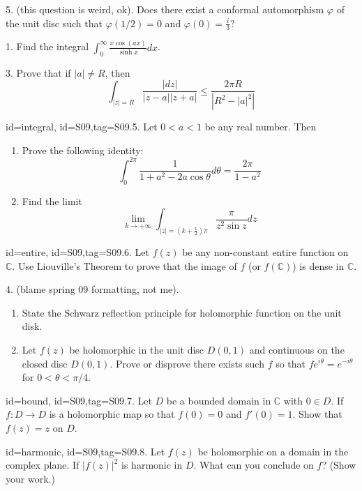 \documentclass[12pt,letterpaper]{article}
\theoremstyle{plain}
\theoremstyle{definition}
\begin{document}
{5. (this question is weird, ok). Does there exist a conformal automorphism $\varphi$ of the unit disc such that $\varphi(1/2) = 0$ and $\varphi(0) = \frac{i}{3}$?

1. Find the integral $\int_{0}^{\infty} \frac{x \cos(ax)}{\sinh x} dx$.

3. Prove that if $| a | \ne R$, then
\[
	\int_{| z | = R} \frac{| dz |}{| z-a || z+a |} \le \frac{2 \pi R}{\left| R^2 - | a |^2 \right|}
\]



\item[id=integral, id=S09,tag=S09.5.]
Let $0 < a < 1$ be any real number. Then
\begin{enumerate}[label=(\alph*)]\onlyitems
\item Prove the following identity:
\[
	\int_{0}^{2\pi} \frac{1}{1 + a^2 - 2a \cos \theta} d\theta = \frac{2\pi}{1-a^2}
\]
\item Find the limit
\[
	\lim_{k\rightarrow+\infty} \int_{| z | = (k + \frac{1}{2})\pi} \frac{\pi}{z^2 \sin z} dz
\]
\end{enumerate}


\item[id=entire, id=S09,tag=S09.6.]
Let $f(z)$ be any non-constant entire function on $\mathbb{C}$. Use Liouville's Theorem to prove that the image of $f$ (or $f(\mathbb{C})$) is dense in $\mathbb{C}$.

4. (blame spring 09 formatting, not me).
\begin{enumerate}[label=(\alph*)]\onlyitems
\item State the Schwarz reflection principle for holomorphic function on the unit disk.
\item Let $f(z)$ be holomorphic in the unit disc $D(0,1)$ and continuous on the closed disc $\overline{D(0,1)}$. Prove or disprove there exists such $f$ so that $fe^{i\theta} = e^{-i\theta}$ for $0 < \theta < \pi/4$.
\end{enumerate}

\item[id=bound, id=S09,tag=S09.7.]
Let $D$ be a bounded domain in $\mathbb{C}$ with $0 \in D$. If $f : D \rightarrow D$ is a holomorphic map so that $f(0) = 0$ and $f'(0) = 1$. Show that $f(z) = z$ on $D$.

\item[id=harmonic, id=S09,tag=S09.8.]
Let $f(z)$ be holomorphic on a domain in the complex plane. If $| f(z) |^2$ is harmonic in $D$. What can you conclude on $f$? (Show your work.)

}
\end{document}
